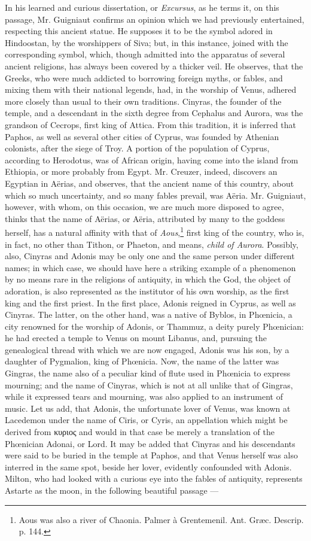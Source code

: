 \documentclass[a4paper, 11pt, oneside, polutonikogreek, english]{article}
\begin{document}
In his learned and curious dissertation, or \emph{Excursus}, as he terms it, on this passage, Mr. Guigniaut confirms an opinion which we had previously entertained, respecting this ancient statue. He supposes it to be the symbol adored in Hindoostan, by the worshippers of Siva; but, in this instance, joined with the corresponding symbol, which, though admitted into the apparatus of several ancient religions, has always been covered by a thicker veil. He observes, that the Greeks, who were much addicted to borrowing foreign myths, or fables, and mixing them with their national legends, had, in the worship of Venus, adhered more closely than usual to their own traditions. Cinyras, the founder of the temple, and a descendant in the sixth degree from Cephalus and Aurora, was the grandson of Cecrops, first king of Attica. From this tradition, it is inferred that Paphos, as well as several other cities of Cyprus, was founded by Athenian colonists, after the siege of Troy. A portion of the population of Cyprus, according to Herodotus, was of African origin, having come into the island from Ethiopia, or more probably from Egypt. Mr. Creuzer, indeed, discovers an Egyptian in Aërias, and observes, that the ancient name of this country, about which so much uncertainty, and so many fables prevail, was Aëria. Mr. Guigniaut, however, with whom, on this occasion, we are much more disposed to agree, thinks that the name of Aërias, or Aëria, attributed by many to the goddess herself, has a natural affinity with that of \emph{Aous},\footnote{Aous was also a river of Chaonia. Palmer à Grentemenil. Ant. Græc. Descrip. p. 144.} first king of the country, who is, in fact, no other than Tithon, or Phaeton, and means, \emph{child of Aurora}. Possibly, also, Cinyras and Adonis may be only one and the same person under different names; in which case, we should have here a striking example of a phenomenon by no means rare in the religions of antiquity, in which the God, the object of adoration, is also represented as the institutor of his own worship, as the first king and the first priest. In the first place, Adonis reigned in Cyprus, as well as Cinyras. The latter, on the other hand, was a native of Byblos, in Phœnicia, a city renowned for the worship of Adonis, or Thammuz, a deity purely Phœnician: he had erected a temple to Venus on mount Libanus, and, pursuing the genealogical thread with which we are now engaged, Adonis was his son, by a daughter of Pygmalion, king of Phœnicia. Now, the name of the latter was Gingras, the name also of a peculiar kind of flute used in Phœnicia to express mourning; and the name of Cinyras, which is not at all unlike that of Gingras, while it expressed tears and mourning, was also applied to an instrument of music. Let us add, that Adonis, the unfortunate lover of Venus, was known at Lacedemon under the name of Ciris, or Cyris, an appellation which might be derived from κυριος and would in that case be merely a translation of the Phœnician Adonai, or Lord. It may be added that Cinyras and his descendants were said to be buried in the temple at Paphos, and that Venus herself was also interred in the same spot, beside her lover, evidently confounded with Adonis. Milton, who had looked with a curious eye into the fables of antiquity, represents Astarte as the moon, in the following beautiful passage --- 
\end{document}
